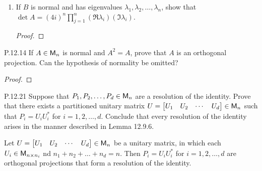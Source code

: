 \documentclass{../homework}
\begin{document}
\begin{problems}
\begin{enumerate}
    \begin{solution}
      \begin{proof}

      \end{proof}
    \end{solution}

  \item If \(B\) is normal and has eigenvalues
    \(\lambda_1, \lambda_2, \dots, \lambda_n\), show that
    \(\det A = (4i)^n \prod_{j=1}^n (\Re \lambda_i)(\Im \lambda_i)\).

    \begin{solution}
      \begin{proof}

      \end{proof}
    \end{solution}
  \end{enumerate}

\item[P.12.14] If \(A \in \mathsf{M}_n\) is normal and \(A^2 = A\), prove that
  \(A\) is an orthogonal projection.  Can the hypothesis of normality
  be omitted?

  \begin{solution}
    \begin{proof}

    \end{proof}
  \end{solution}

\item[P.12.21] Suppose that \(P_1, P_2, \dots, P_d \in \mathsf{M}_n\) are a
  resolution of the identity.  Prove that there exists a partitioned
  unitary matrix
  \(U = \begin{bmatrix} U_1 & U_2 & \cdots & U_d \end{bmatrix} \in
  \mathsf{M}_n\) such that \(P_i = U_i U_i^*\) for \(i = 1, 2, \dots, d\).
  Conclude that every resolution of the identity arises in the manner
  described in Lemma 12.9.6.

  \begin{booklemma}[12.9.6]
    Let
    \(U = \begin{bmatrix} U_1 & U_2 & \cdots & U_d \end{bmatrix} \in
    \mathsf{M}_n\) be a unitary matrix, in which each
    \(U_i \in \mathsf{M}_{n \times n_i}\) nd \(n_1 + n_2 + \dots + n_d =n\).
    Then \(P_i = U_i U_i^*\) for \(i = 1, 2, \dots, d\) are orthogonal
    projections that form a resolution of the identity.
  \end{booklemma}


\end{problems}
\end{document}
